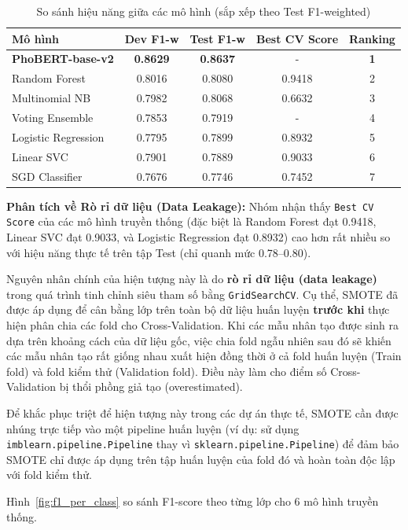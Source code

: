 \begin{table}[H]
\centering
\caption{So sánh hiệu năng giữa các mô hình (sắp xếp theo Test F1-weighted)}
\label{tab:model_compare}
\begin{tabular}{|l|c|c|c|c|}
\hline
\textbf{Mô hình} & \textbf{Dev F1-w} & \textbf{Test F1-w} & \textbf{Best CV Score} & \textbf{Ranking} \\
\hline
\textbf{PhoBERT-base-v2} & \textbf{0.8629} & \textbf{0.8637} & - & \textbf{1} \\
Random Forest & 0.8016 & 0.8080 & 0.9418 & 2 \\
Multinomial NB & 0.7982 & 0.8068 & 0.6632 & 3 \\
Voting Ensemble & 0.7853 & 0.7919 & - & 4 \\
Logistic Regression & 0.7795 & 0.7899 & 0.8932 & 5 \\
Linear SVC & 0.7901 & 0.7889 & 0.9033 & 6 \\
SGD Classifier & 0.7676 & 0.7746 & 0.7452 & 7 \\
\hline
\end{tabular}
\end{table}

\textbf{Phân tích về Rò rỉ dữ liệu (Data Leakage):} Nhóm nhận thấy \texttt{Best CV Score} của các mô hình truyền thống (đặc biệt là Random Forest đạt 0.9418, Linear SVC đạt 0.9033, và Logistic Regression đạt 0.8932) cao hơn rất nhiều so với hiệu năng thực tế trên tập Test (chỉ quanh mức 0.78--0.80). 

Nguyên nhân chính của hiện tượng này là do \textbf{rò rỉ dữ liệu (data leakage)} trong quá trình tinh chỉnh siêu tham số bằng \texttt{GridSearchCV}. Cụ thể, SMOTE đã được áp dụng để cân bằng lớp trên toàn bộ dữ liệu huấn luyện \textbf{trước khi} thực hiện phân chia các fold cho Cross-Validation. Khi các mẫu nhân tạo được sinh ra dựa trên khoảng cách của dữ liệu gốc, việc chia fold ngẫu nhiên sau đó sẽ khiến các mẫu nhân tạo rất giống nhau xuất hiện đồng thời ở cả fold huấn luyện (Train fold) và fold kiểm thử (Validation fold). Điều này làm cho điểm số Cross-Validation bị thổi phồng giả tạo (overestimated). 

Để khắc phục triệt để hiện tượng này trong các dự án thực tế, SMOTE cần được nhúng trực tiếp vào một pipeline huấn luyện (ví dụ: sử dụng \texttt{imblearn.pipeline.Pipeline} thay vì \texttt{sklearn.pipeline.Pipeline}) để đảm bảo SMOTE chỉ được áp dụng trên tập huấn luyện của fold đó và hoàn toàn độc lập với fold kiểm thử.


Hình~\ref{fig:f1_per_class} so sánh F1-score theo từng lớp cho 6 mô hình truyền thống.

